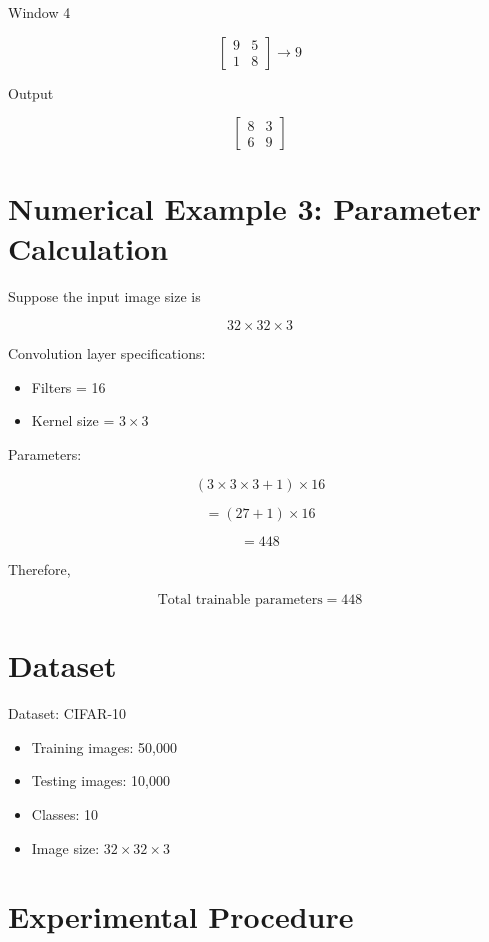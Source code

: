 \documentclass[12pt,a4paper]{article}
\begin{document}
Window 4

\[
\begin{bmatrix}
9 & 5\\
1 & 8
\end{bmatrix}
\rightarrow 9
\]

Output

\[
\begin{bmatrix}
8 & 3\\
6 & 9
\end{bmatrix}
\]

\section{Numerical Example 3: Parameter Calculation}

Suppose the input image size is

\[
32 \times 32 \times 3
\]

Convolution layer specifications:

\begin{itemize}
    \item Filters = 16
    \item Kernel size = \(3 \times 3\)
\end{itemize}

Parameters:

\[
(3 \times 3 \times 3 + 1) \times 16
\]

\[
=(27+1)\times16
\]

\[
=448
\]

Therefore,

\[
\text{Total trainable parameters}=448
\]

\section{Dataset}

Dataset: CIFAR-10

\begin{itemize}
    \item Training images: 50,000
    \item Testing images: 10,000
    \item Classes: 10
    \item Image size: \(32 \times 32 \times 3\)
\end{itemize}

\section{Experimental Procedure}
\end{document}
